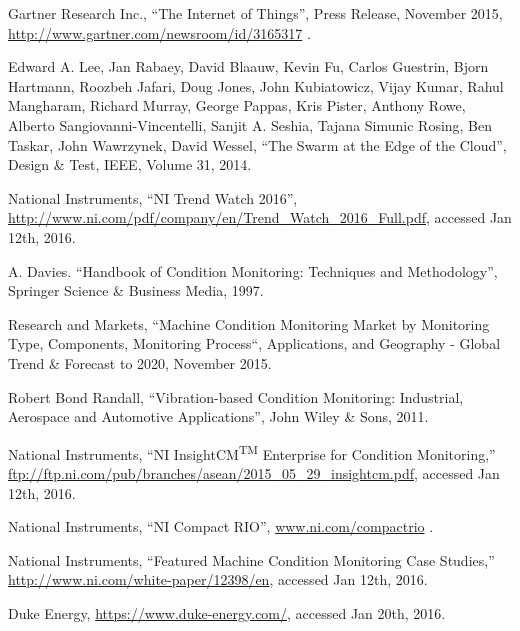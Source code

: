 
\begin{thebibliography}{10}

Gartner Research Inc., ``The Internet of Things'', Press Release, November 2015, \url{http://www.gartner.com/newsroom/id/3165317} .

Edward A. Lee, Jan Rabaey, David Blaauw, Kevin Fu, Carlos Guestrin, Bjorn Hartmann, Roozbeh Jafari, Doug Jones, John Kubiatowicz, Vijay Kumar, Rahul Mangharam, Richard Murray, George Pappas, Kris Pister, Anthony Rowe, Alberto Sangiovanni-Vincentelli, Sanjit A. Seshia, Tajana Simunic Rosing, Ben Taskar, John Wawrzynek, David Wessel, ``The Swarm at the Edge of the Cloud'', Design \& Test, IEEE, Volume 31, 2014.

National Instruments, ``NI Trend Watch 2016'', \url{http://www.ni.com/pdf/company/en/Trend_Watch_2016_Full.pdf}, accessed Jan 12th, 2016.

A. Davies. ``Handbook of Condition Monitoring: Techniques and Methodology'',  Springer Science \& Business Media, 1997.

Research and Markets, ``Machine Condition Monitoring Market by Monitoring Type, Components, Monitoring Process``, Applications, and Geography - Global Trend \& Forecast to 2020,
November 2015.


Robert Bond Randall, 
``Vibration-based Condition Monitoring: Industrial, Aerospace and Automotive Applications'', 
John Wiley \& Sons, 2011.

National Instruments, ``NI InsightCM\textsuperscript{TM} Enterprise for Condition Monitoring,'' \url{ftp://ftp.ni.com/pub/branches/asean/2015_05_29_insightcm.pdf}, accessed Jan 12th, 2016.

National Instruments, ``NI Compact RIO'', \url{www.ni.com/compactrio} .

National Instruments, ``Featured Machine Condition Monitoring Case Studies,'' \url{http://www.ni.com/white-paper/12398/en}, accessed Jan 12th, 2016.

Duke Energy, \url{https://www.duke-energy.com/}, accessed Jan 20th, 2016.


\end{thebibliography}

